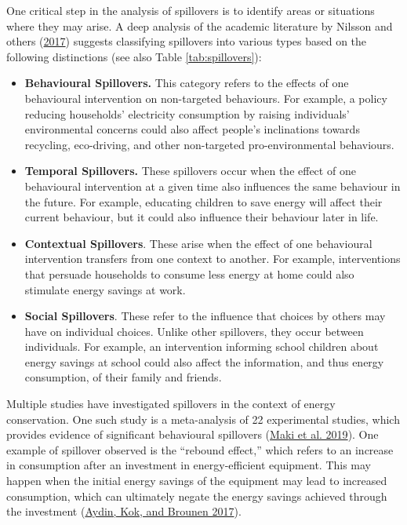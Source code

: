 \documentclass[
  11pt,
  captions=heading]{scrreport}
\begin{document}
One critical step in the analysis of spillovers is to identify areas or
situations where they may arise. A deep analysis of the academic
literature by Nilsson and others
(\protect\hyperlink{ref-nilsson2017spillover}{2017}) suggests
classifying spillovers into various types based on the following
distinctions (see also Table \ref{tab:spillovers}):

\begin{itemize}
\item
  \textbf{Behavioural Spillovers.} This category refers to the effects
  of one behavioural intervention on non-targeted behaviours. For
  example, a policy reducing households' electricity consumption by
  raising individuals' environmental concerns could also affect people's
  inclinations towards recycling, eco-driving, and other non-targeted
  pro-environmental behaviours.
\item
  \textbf{Temporal Spillovers.} These spillovers occur when the effect
  of one behavioural intervention at a given time also influences the
  same behaviour in the future. For example, educating children to save
  energy will affect their current behaviour, but it could also
  influence their behaviour later in life.
\item
  \textbf{Contextual Spillovers}. These arise when the effect of one
  behavioural intervention transfers from one context to another. For
  example, interventions that persuade households to consume less energy
  at home could also stimulate energy savings at work.
\item
  \textbf{Social Spillovers}. These refer to the influence that choices
  by others may have on individual choices. Unlike other spillovers,
  they occur between individuals. For example, an intervention informing
  school children about energy savings at school could also affect the
  information, and thus energy consumption, of their family and friends.
\end{itemize}

Multiple studies have investigated spillovers in the context of energy
conservation. One such study is a meta-analysis of 22 experimental
studies, which provides evidence of significant behavioural spillovers
(\protect\hyperlink{ref-maki2019meta}{Maki et al. 2019}). One example of
spillover observed is the ``rebound effect,'' which refers to an
increase in consumption after an investment in energy-efficient
equipment. This may happen when the initial energy savings of the
equipment may lead to increased consumption, which can ultimately negate
the energy savings achieved through the investment
(\protect\hyperlink{ref-aydin2017energy}{Aydin, Kok, and Brounen 2017}).
\end{document}
